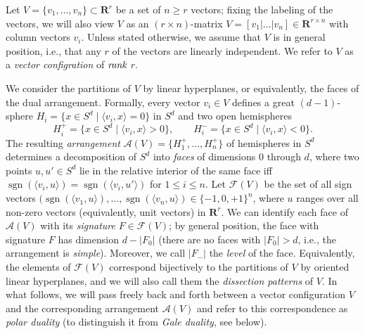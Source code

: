 \documentclass[a4paper,USenglish,cleveref, autoref, thm-restate,nolineno]{socg-lipics-v2021}
\newcommand{\arr}{\mathcal{A}}
\DeclareMathOperator{\sgn}{sgn}
\renewcommand{\leq}{\leqslant}
\renewcommand{\geq}{\geqslant}
\newcommand{\R}{\mathbf{R}}
\begin{document}
Let $V = \{ v_1, \ldots, v_n \} \subset \R^r$ be a set of $n\geq r$ vectors; fixing the labeling of the vectors, we will also view $V$ as an $(r\times n)$-matrix $V=[v_1|\dots|v_n] \in \R^{r\times n}$ with column vectors $v_i$. Unless stated otherwise, we assume that $V$ is in general position, i.e., that any $r$ of the vectors are linearly independent. We refer to $V$ as a \emph{vector configration} of $\emph{rank}$ $r$. 

We consider the partitions of $V$ by linear hyperplanes, or equivalently, the faces of the dual arrangement. Formally, every vector $v_i \in V$ defines a great $(d-1)$-sphere
$
H_i = \{ x \in S^d \mid \langle v_i, x \rangle = 0 \}
$
in $S^d$ and two open hemispheres
$$
H_i^+ = \{ x \in S^d \mid \langle v_i, x \rangle >0 \}, \qquad H_i^- = \{ x \in S^d \mid \langle v_i, x \rangle < 0 \}.
$$
The resulting \emph{arrangement} $\arr(V)=\{H_1^+,\dots,H_n^+\}$ of hemispheres in $S^d$ determines a decomposition of $S^d$ into \emph{faces} of dimensions $0$ through $d$, where two points $u,u'\in S^d$ lie in the relative interior of the same face iff $\sgn(\langle v_i,u \rangle)=\sgn(\langle v_i,u'\rangle)$ for $1\leq i\leq n$. Let $\mathcal{F}(V)$ be the set of all sign vectors $(\sgn(\langle v_1,u\rangle),\dots,\sgn(\langle v_n,u\rangle) \in \{-1,0,+1\}^n$, where $u$ ranges over all non-zero vectors (equivalently, unit vectors) in $\R^r$. We can identify each face of $\arr(V)$ with its \emph{signature} $F\in \mathcal{F}(V)$; by general position, the face with signature $F$ has dimension $d-|F_0|$ (there are no faces with $|F_0|>d$, i.e., the arrangement is \emph{simple}). Moreover, we call $|F_-|$ the \emph{level} of the face. Equivalently, the elements of $\mathcal{F}(V)$ correspond bijectively to the partitions of $V$ by oriented linear hyperplanes, and we will also call them the \emph{dissection patterns} of $V$. In what follows, we will pass freely back and forth between a vector configuration $V$ and the corresponding arrangement $\mathcal{A}(V)$ and refer to this correspondence as \emph{polar duality} (to distinguish it from \emph{Gale duality}, see below).
\end{document}
